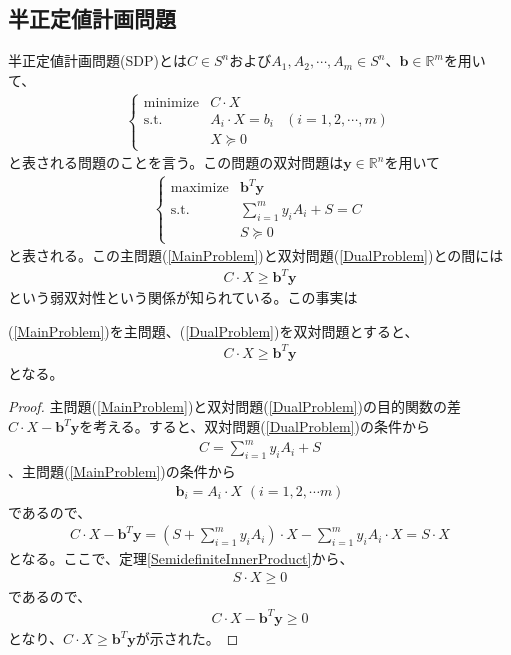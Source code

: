 \subsection{半正定値計画問題}
半正定値計画問題(SDP)とは$C \in S^n$および$A_1, A_2, \cdots, A_m \in S^n$、$\mathbf{b} \in \mathbb{R}^m$を用いて、
\begin{align} \label{MainProblem}
  \left\{
    \begin{array}{lll}
      \mathrm{minimize} & C \cdot X \\
      \mathrm{s.t.}     & A_i \cdot X = b_i & (i = 1, 2, \cdots, m) \\
                        & X \succeq 0
    \end{array}
  \right.
\end{align}
と表される問題のことを言う。この問題の双対問題は$\mathbf{y} \in \mathbb{R}^n$を用いて
\begin{align} \label{DualProblem}
  \left\{
    \begin{array}{lll}
      \mathrm{maximize} & \mathbf{b}^T \mathbf{y} \\
      \mathrm{s.t.}     & \displaystyle{\sum_{i = 1}^m} y_i A_i + S = C \\
                        & S \succeq 0
    \end{array}
  \right.
\end{align}
と表される。この主問題(\ref{MainProblem})と双対問題(\ref{DualProblem})との間には
\begin{align*}
  C \cdot X \geq \mathbf{b}^T \mathbf{y}
\end{align*}
という弱双対性という関係が知られている。この事実は
\begin{theorem*}
  (\ref{MainProblem})を主問題、(\ref{DualProblem})を双対問題とすると、
  \begin{align*}
    C \cdot X \geq \mathbf{b}^T \mathbf{y}
  \end{align*}
  となる。
\end{theorem*}
\begin{proof}
  主問題(\ref{MainProblem})と双対問題(\ref{DualProblem})の目的関数の差$C \cdot X - \mathbf{b}^T \mathbf{y}$を考える。すると、双対問題(\ref{DualProblem})の条件から
  \begin{align*}
    C = \displaystyle{\sum_{i = 1}^m} y_i A_i + S
  \end{align*}
  、主問題(\ref{MainProblem})の条件から
  \begin{align*}
    \mathbf{b}_i = A_i \cdot X \,\, (i = 1, 2, \cdots m)
  \end{align*}
  であるので、
  \begin{align*}
    C \cdot X - \mathbf{b}^T \mathbf{y} = \left(S + \displaystyle{\sum_{i = 1}^m} y_i A_i\right) \cdot X - \displaystyle{\sum_{i = 1}^m} y_i A_i \cdot X = S \cdot X
  \end{align*}
  となる。ここで、定理\ref{SemidefiniteInnerProduct}から、
  \begin{align*}
    S \cdot X \geq 0
  \end{align*}
  であるので、
  \begin{align*}
    C \cdot X - \mathbf{b}^T \mathbf{y} \geq 0
  \end{align*}
  となり、$C \cdot X \geq \mathbf{b}^T \mathbf{y}$が示された。
\end{proof}
